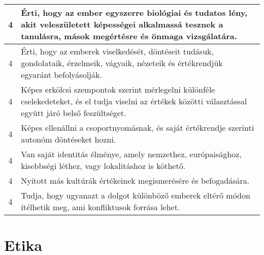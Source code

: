 \begin{longtable}{c | p{12cm} }
                                
                                          4 &  Érti, hogy az ember egyszerre biológiai és tudatos lény, akit veleszületett képességei alkalmassá tesznek a tanulásra, mások megértésre és önmaga vizsgálatára. \\ \hline
                                          4 &  Érti, hogy az emberek viselkedését, döntéseit tudásuk, gondolataik, érzelmeik, vágyaik, nézeteik és értékrendjük egyaránt befolyásolják. \\ \hline
                                          4 &  Képes erkölcsi szempontok szerint mérlegelni különféle cselekedeteket, és el tudja viselni az értékek közötti választással együtt járó belső feszültséget. \\ \hline
                                          4 &  Képes ellenállni a csoportnyomásnak, és saját értékrendje szerinti autonóm döntéseket hozni. \\ \hline
                                          4 &  Van saját identitás élménye, amely nemzethez, európaisághoz, kisebbségi léthez, vagy lokalitáshoz is köthető. \\ \hline
                                          4 &  Nyitott más kultúrák értékeinek megismerésére és befogadására. \\ \hline
                                          4 &  Tudja, hogy ugyanazt a dolgot különböző emberek eltérő módon ítélhetik meg, ami konfliktusok forrása lehet. \\ \hline
                                      
                        \end{longtable}
            \clearpage

        \section{Etika}

